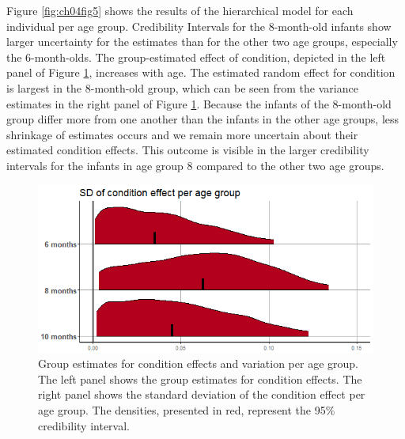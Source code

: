 \documentclass[openright,titlepage,12pt,a4paper]{book}
\begin{document}
Figure \ref{fig:ch04fig5} shows the results of the hierarchical model for each individual per age group. Credibility Intervals for the 8-month-old infants show larger uncertainty for the estimates than for the other two age groups, especially the 6-month-olds. The group-estimated effect of condition, depicted in the left panel of Figure \ref{fig:ch04fig6}, increases with age. The estimated random effect for condition is largest in the 8-month-old group, which can be seen from the variance estimates in the right panel of Figure \ref{fig:ch04fig6}. Because the infants of the 8-month-old group differ more from one another than the infants in the other age groups, less shrinkage of estimates occurs and we remain more uncertain about their estimated condition effects. This outcome is visible in the larger credibility intervals for the infants in age group 8 compared to the other two age groups.

\begin{figure}

{\centering \includegraphics[width=0.9\linewidth]{figures/chapter_4/Figure6} 

}

\caption{Group estimates for condition effects and variation per age group.  The left panel shows the group estimates for condition effects. The right panel shows the standard deviation of the condition effect per age group. The densities, presented in red, represent the 95\% credibility interval.}\label{fig:ch04fig6}
\end{figure}
\end{document}
